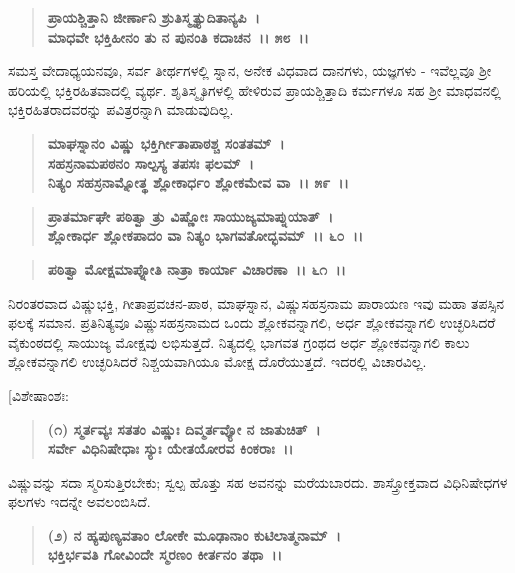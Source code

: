 \begin{verse}
\textbf{ಪ್ರಾಯಶ್ಚಿತ್ತಾನಿ ಜೀರ್ಣಾನಿ ಶ್ರುತಿಸ್ಮೃತ್ಯುದಿತಾನ್ಯಪಿ~।}\\\textbf{ಮಾಧವೇ ಭಕ್ತಿಹೀನಂ ತು ನ ಪುನಂತಿ ಕದಾಚನ~।। ೫೮~।।}
\end{verse}

ಸಮಸ್ತ ವೇದಾಧ್ಯಯನವೂ, ಸರ್ವ ತೀರ್ಥಗಳಲ್ಲಿ ಸ್ನಾನ, ಅನೇಕ ವಿಧವಾದ ದಾನಗಳು, ಯಜ್ಞಗಳು - ಇವೆಲ್ಲವೂ ಶ‍್ರೀ ಹರಿಯಲ್ಲಿ ಭಕ್ತಿರಹಿತವಾದಲ್ಲಿ ವ್ಯರ್ಥ. ಶೃತಿಸ್ಮೃತಿಗಳಲ್ಲಿ ಹೇಳಿರುವ ಪ್ರಾಯಶ್ಚಿತ್ತಾದಿ ಕರ್ಮಗಳೂ ಸಹ ಶ‍್ರೀ ಮಾಧವನಲ್ಲಿ ಭಕ್ತಿರಹಿತರಾದವರನ್ನು ಪವಿತ್ರರನ್ನಾಗಿ ಮಾಡುವುದಿಲ್ಲ.

\begin{verse}
\textbf{ಮಾಘಸ್ನಾನಂ ವಿಷ್ಣು ಭಕ್ತಿರ್ಗೀತಾಪಾಠಶ್ಚ ಸಂತತಮ್~।}\\\textbf{ಸಹಸ್ರನಾಮಪಠನಂ ಸಾಲ್ಪಸ್ಯ ತಪಸಃ ಫಲಮ್~।}\\\textbf{ನಿತ್ಯಂ ಸಹಸ್ರನಾಮ್ನೋತ್ಥ ಶ್ಲೋಕಾರ್ಧಂ ಶ್ಲೋಕಮೇವ ವಾ~।। ೫೯~।।}
\end{verse}

\begin{verse}
\textbf{ಪ್ರಾತರ್ಮಾಘೇ ಪಠಿತ್ವಾ ತ್ರು ವಿಷ್ಣೋಃ ಸಾಯುಜ್ಯಮಾಪ್ನುಯಾತ್~।}\\\textbf{ಶ್ಲೋಕಾರ್ಧ ಶ್ಲೋಕಪಾದಂ ವಾ ನಿತ್ಯಂ ಭಾಗವತೋದ್ಭವಮ್~।। ೬೦~।।}
\end{verse}

\begin{verse}
\textbf{ಪಠಿತ್ವಾ ಮೋಕ್ಷಮಾಪ್ನೋತಿ ನಾತ್ರಾ ಕಾರ್ಯಾ ವಿಚಾರಣಾ~।। ೬೧~।।}
\end{verse}

ನಿರಂತರವಾದ ವಿಷ್ಣುಭಕ್ತಿ, ಗೀತಾಪ್ರವಚನ-ಪಾಠ, ಮಾಘಸ್ನಾನ, ವಿಷ್ಣುಸಹಸ್ರನಾಮ ಪಾರಾಯಣ ಇವು ಮಹಾ ತಪಸ್ಸಿನ ಫಲಕ್ಕೆ ಸಮಾನ. ಪ್ರತಿನಿತ್ಯವೂ ವಿಷ್ಣುಸಹಸ್ರನಾಮದ ಒಂದು ಶ್ಲೋಕವನ್ನಾಗಲಿ, ಅರ್ಧ ಶ್ಲೋಕವನ್ನಾಗಲಿ ಉಚ್ಛರಿಸಿದರೆ ವೈಕುಂಠದಲ್ಲಿ ಸಾಯುಜ್ಯ ಮೋಕ್ಷವು ಲಭಿಸುತ್ತದೆ. ನಿತ್ಯದಲ್ಲಿ ಭಾಗವತ ಗ್ರಂಥದ ಅರ್ಧ ಶ್ಲೋಕವನ್ನಾಗಲಿ ಕಾಲು ಶ್ಲೋಕವನ್ನಾಗಲಿ ಉಚ್ಛರಿಸಿದರೆ ನಿಶ್ಚಯವಾಗಿಯೂ ಮೋಕ್ಷ ದೊರೆಯುತ್ತದೆ. ಇದರಲ್ಲಿ ವಿಚಾರವಿಲ್ಲ.

[ವಿಶೇಷಾಂಶಃ:

\begin{verse}
\textbf{(೧) ಸ್ಮರ್ತವ್ಯಃ ಸತತಂ ವಿಷ್ಣುಃ ದಿವ್ಮರ್ತವ್ಯೋ ನ ಜಾತುಚಿತ್~।}\\\textbf{ಸರ್ವೇ ವಿಧಿನಿಷೇಧಾಃ ಸ್ಯುಃ ಯೇತಯೋರವ ಕಿಂಕರಾಃ~।।}\\
\end{verse}

ವಿಷ್ಣುವನ್ನು ಸದಾ ಸ್ಮರಿಸುತ್ತಿರಬೇಕು; ಸ್ವಲ್ಪ ಹೊತ್ತು ಸಹ ಅವನನ್ನು ಮರೆಯಬಾರದು. ಶಾಸ್ತ್ರೋಕ್ತವಾದ ವಿಧಿನಿಷೇಧಗಳ ಫಲಗಳು ಇದನ್ನೇ ಅವಲಂಬಿಸಿದೆ.

\begin{verse}
\textbf{(೨) ನ ಹ್ಯಪುಣ್ಯವತಾಂ ಲೋಕೇ ಮೂಢಾನಾಂ ಕುಟಿಲಾತ್ಮನಾಮ್~।}\\\textbf{ಭಕ್ತಿರ್ಭವತಿ ಗೋವಿಂದೇ ಸ್ಮರಣಂ ಕೀರ್ತನಂ ತಥಾ~।।}\\
\end{verse}


